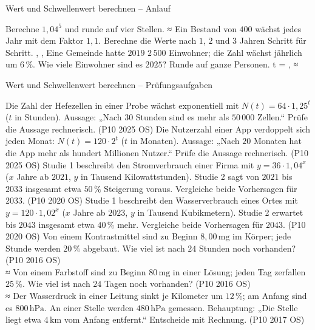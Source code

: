 \begin{aufgabe}{Wert und Schwellenwert berechnen – Anlauf}
\begin{teile}
\teil Berechne $1{,}04^5$ und runde auf vier Stellen. ≈ \leerfeld
\teil Ein Bestand von $400$ wächst jedes Jahr mit dem Faktor $1{,}1$. Berechne die Werte nach $1$, $2$ und $3$ Jahren Schritt für Schritt. \leerfeld , \leerfeld , \leerfeld
\teil Eine Gemeinde hatte $2019$ $2\,500$ Einwohner; die Zahl wächst jährlich um $6\,\%$. Wie viele Einwohner sind es $2025$? Runde auf ganze Personen. t = \leerfeld , ≈ \leerfeld
\end{teile}
\end{aufgabe}

\begin{aufgabe}{Wert und Schwellenwert berechnen – Prüfungsaufgaben}
\begin{teile}
\steil Die Zahl der Hefezellen in einer Probe wächst exponentiell mit $N(t) = 64 \cdot 1{,}25^t$ ($t$ in Stunden). Aussage: „Nach $30$ Stunden sind es mehr als $50\,000$ Zellen.“ Prüfe die Aussage rechnerisch. \hfill (P10 2025 OS)
\steil Die Nutzerzahl einer App verdoppelt sich jeden Monat: $N(t) = 120 \cdot 2^t$ ($t$ in Monaten). Aussage: „Nach $20$ Monaten hat die App mehr als hundert Millionen Nutzer.“ Prüfe die Aussage rechnerisch. \hfill (P10 2025 OS)
\steil Studie 1 beschreibt den Stromverbrauch einer Firma mit $y = 36 \cdot 1{,}04^x$ ($x$ Jahre ab $2021$, $y$ in Tausend Kilowattstunden). Studie 2 sagt von $2021$ bis $2033$ insgesamt etwa $50\,\%$ Steigerung voraus. Vergleiche beide Vorhersagen für $2033$. \hfill (P10 2020 OS)
\steil Studie 1 beschreibt den Wasserverbrauch eines Ortes mit $y = 120 \cdot 1{,}02^x$ ($x$ Jahre ab $2023$, $y$ in Tausend Kubikmetern). Studie 2 erwartet bis $2043$ insgesamt etwa $40\,\%$ mehr. Vergleiche beide Vorhersagen für $2043$. \hfill (P10 2020 OS)
\steil Von einem Kontrastmittel sind zu Beginn $8{,}00\,\mathrm{mg}$ im Körper; jede Stunde werden $20\,\%$ abgebaut. Wie viel ist nach $24$ Stunden noch vorhanden? \hfill (P10 2016 OS) \\ ≈ \leerfeld[mg]
\steil Von einem Farbstoff sind zu Beginn $80\,\mathrm{mg}$ in einer Lösung; jeden Tag zerfallen $25\,\%$. Wie viel ist nach $24$ Tagen noch vorhanden? \hfill (P10 2016 OS) \\ ≈ \leerfeld[mg]
\teil Der Wasserdruck in einer Leitung sinkt je Kilometer um $12\,\%$; am Anfang sind es $800\,\mathrm{hPa}$. An einer Stelle werden $480\,\mathrm{hPa}$ gemessen. Behauptung: „Die Stelle liegt etwa $4\,\mathrm{km}$ vom Anfang entfernt.“ Entscheide mit Rechnung. \hfill (P10 2017 OS)

\end{teile}
\end{aufgabe}
